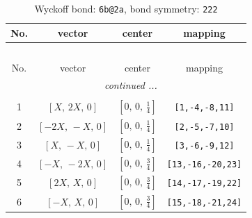 \documentclass[fleqn,8pt]{jsarticle}
\begin{document}
\begin{longtable}{cccc}
\caption{Wyckoff bond: {\tt 6b@2a}, bond symmetry: {\tt 222}}
 \\
 \hline \hline
No. & vector & center & mapping \\ \hline \endfirsthead

\multicolumn{3}{l}{\tablename\ \thetable{}} \\
 \hline \hline
No. & vector & center & mapping \\ \hline \endhead

 \hline \hline
\multicolumn{3}{r}{\footnotesize\it continued ...} \\ \endfoot

 \hline \hline
\multicolumn{3}{r}{} \\ \endlastfoot

1 & $\left[ X,\, 2 X,\, 0 \right]$ & $\left[ 0,\, 0,\, \frac{1}{4} \right]$ & {\tt [1,-4,-8,11]} \\ \hline
2 & $\left[ - 2 X,\, - X,\, 0 \right]$ & $\left[ 0,\, 0,\, \frac{1}{4} \right]$ & {\tt [2,-5,-7,10]} \\ \hline
3 & $\left[ X,\, - X,\, 0 \right]$ & $\left[ 0,\, 0,\, \frac{1}{4} \right]$ & {\tt [3,-6,-9,12]} \\ \hline
4 & $\left[ - X,\, - 2 X,\, 0 \right]$ & $\left[ 0,\, 0,\, \frac{3}{4} \right]$ & {\tt [13,-16,-20,23]} \\ \hline
5 & $\left[ 2 X,\, X,\, 0 \right]$ & $\left[ 0,\, 0,\, \frac{3}{4} \right]$ & {\tt [14,-17,-19,22]} \\ \hline
6 & $\left[ - X,\, X,\, 0 \right]$ & $\left[ 0,\, 0,\, \frac{3}{4} \right]$ & {\tt [15,-18,-21,24]} \\
\end{longtable}
\renewcommand{\arraystretch}{1.2}
\end{document}
